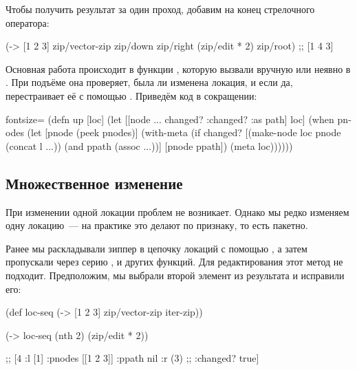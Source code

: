 Чтобы получить результат за один проход, добавим  на конец стрелочного
оператора:

\begin{english}
  \begin{clojure}
(-> [1 2 3]
    zip/vector-zip
    zip/down
    zip/right
    (zip/edit * 2)
    zip/root)
;; [1 4 3]
  \end{clojure}
\end{english}

Основная работа происходит в функции , которую вызвали вручную или
неявно в . При подъёме она проверяет, была ли изменена локация, и
если да, перестраивает её с помощью . Приведём код в сокращении:

\begin{english}
  \begin{clojure*}{fontsize=\small}
(defn up
  [loc]
  (let [[node {... changed? :changed? :as path}] loc]
    (when pnodes
      (let [pnode (peek pnodes)]
        (with-meta (if changed?
                     [(make-node loc pnode (concat l ...))
                      (and ppath (assoc ...))]
                     [pnode ppath])
                   (meta loc))))))
  \end{clojure*}
\end{english}

\subsection{Множественное изменение}

При изменении одной локации проблем не возникает. Однако мы редко изменяем одну
локацию~--- на практике это делают по признаку, то есть пакетно.

Ранее мы раскладывали зиппер в цепочку локаций с помощью , а затем
пропускали через серию ,  и других функций. Для редактирования этот
метод не подходит. Предположим, мы выбрали второй элемент из результата
 и исправили его:

\begin{english}
  \begin{clojure}
(def loc-seq
  (-> [1 2 3]
      zip/vector-zip
      iter-zip))

(-> loc-seq (nth 2) (zip/edit * 2))

;; [4 {:l [1] :pnodes [[1 2 3]] :ppath nil :r (3)
;;    :changed? true}]
  \end{clojure}
\end{english}

